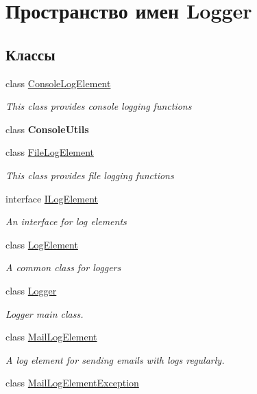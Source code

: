 \hypertarget{namespace_logger}{}\section{Пространство имен Logger}
\label{namespace_logger}
\subsection*{Классы}
\begin{DoxyCompactItemize}
\item 
class \hyperlink{class_logger_1_1_console_log_element}{Console\+Log\+Element}
\begin{DoxyCompactList}\small\item\em This class provides console logging functions \end{DoxyCompactList}\item 
class {\bfseries Console\+Utils}
\item 
class \hyperlink{class_logger_1_1_file_log_element}{File\+Log\+Element}
\begin{DoxyCompactList}\small\item\em This class provides file logging functions \end{DoxyCompactList}\item 
interface \hyperlink{interface_logger_1_1_i_log_element}{I\+Log\+Element}
\begin{DoxyCompactList}\small\item\em An interface for log elements \end{DoxyCompactList}\item 
class \hyperlink{class_logger_1_1_log_element}{Log\+Element}
\begin{DoxyCompactList}\small\item\em A common class for loggers \end{DoxyCompactList}\item 
class \hyperlink{class_logger_1_1_logger}{Logger}
\begin{DoxyCompactList}\small\item\em Logger main class. \end{DoxyCompactList}\item 
class \hyperlink{class_logger_1_1_mail_log_element}{Mail\+Log\+Element}
\begin{DoxyCompactList}\small\item\em A log element for sending emails with logs regularly. \end{DoxyCompactList}\item 
class \hyperlink{class_logger_1_1_mail_log_element_exception}{Mail\+Log\+Element\+Exception}
\end{DoxyCompactItemize}
